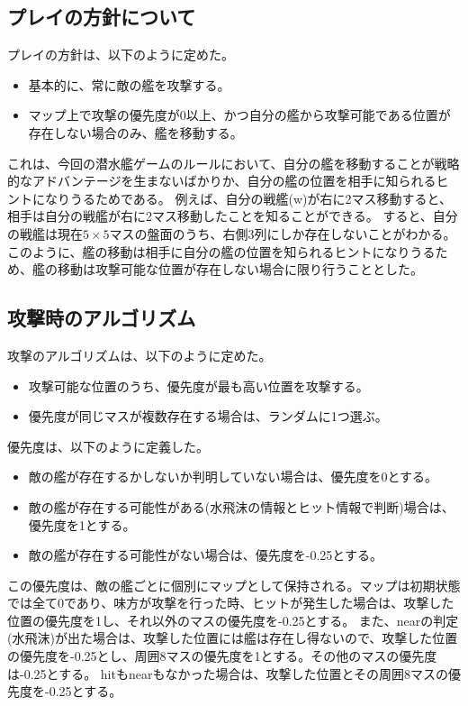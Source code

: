 \documentclass[a4paper,10pt]{ltjsarticle}
\begin{document}
\subsection{プレイの方針について}
プレイの方針は、以下のように定めた。
\begin{itemize}
    \item 基本的に、常に敵の艦を攻撃する。
    \item マップ上で攻撃の優先度が0以上、かつ自分の艦から攻撃可能である位置が存在しない場合のみ、艦を移動する。
\end{itemize}

これは、今回の潜水艦ゲームのルールにおいて、自分の艦を移動することが戦略的なアドバンテージを生まないばかりか、自分の艦の位置を相手に知られるヒントになりうるためである。
例えば、自分の戦艦(w)が右に2マス移動すると、相手は自分の戦艦が右に2マス移動したことを知ることができる。
すると、自分の戦艦は現在$5\times 5$マスの盤面のうち、右側3列にしか存在しないことがわかる。
このように、艦の移動は相手に自分の艦の位置を知られるヒントになりうるため、艦の移動は攻撃可能な位置が存在しない場合に限り行うこととした。

\subsection{攻撃時のアルゴリズム}
攻撃のアルゴリズムは、以下のように定めた。

\begin{itemize}
    \item 攻撃可能な位置のうち、優先度が最も高い位置を攻撃する。
    \item 優先度が同じマスが複数存在する場合は、ランダムに1つ選ぶ。
\end{itemize}

優先度は、以下のように定義した。
\begin{itemize}
    \item 敵の艦が存在するかしないか判明していない場合は、優先度を0とする。
    \item 敵の艦が存在する可能性がある(水飛沫の情報とヒット情報で判断)場合は、優先度を1とする。
    \item 敵の艦が存在する可能性がない場合は、優先度を-0.25とする。
\end{itemize}

この優先度は、敵の艦ごとに個別にマップとして保持される。マップは初期状態では全て0であり、味方が攻撃を行った時、ヒットが発生した場合は、攻撃した位置の優先度を1し、それ以外のマスの優先度を-0.25とする。
また、nearの判定(水飛沫)が出た場合は、攻撃した位置には艦は存在し得ないので、攻撃した位置の優先度を-0.25とし、周囲8マスの優先度を1とする。その他のマスの優先度は-0.25とする。
hitもnearもなかった場合は、攻撃した位置とその周囲8マスの優先度を-0.25とする。
\end{document}
